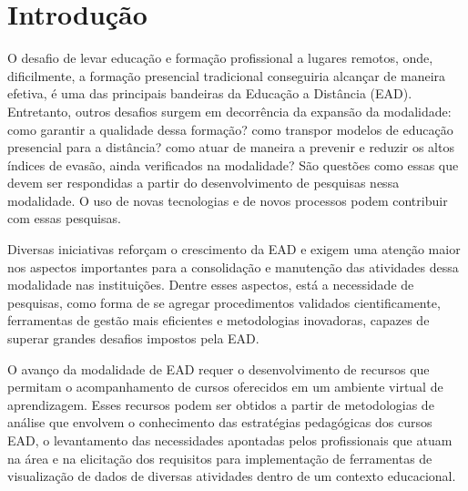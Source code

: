 \chapter{Introdução}

O desafio de levar educação e formação profissional a lugares remotos, onde,
dificilmente, a formação presencial tradicional conseguiria alcançar de maneira
efetiva, é uma das principais bandeiras da Educação a Distância (EAD).
Entretanto, outros desafios surgem em decorrência da expansão da modalidade:
como garantir a qualidade dessa formação? como transpor modelos de educação
presencial para a distância? como atuar de maneira a prevenir e reduzir os altos
índices de evasão, ainda verificados na modalidade? São questões como essas que
devem ser respondidas a partir do desenvolvimento de pesquisas nessa modalidade.
O uso de novas tecnologias e de novos processos podem contribuir com essas
pesquisas.



Diversas iniciativas reforçam o crescimento da EAD e exigem uma atenção maior
nos aspectos importantes para a consolidação e manutenção das atividades dessa
modalidade nas instituições. Dentre esses aspectos, está a necessidade de
pesquisas, como forma de se agregar procedimentos validados cientificamente,
ferramentas de gestão mais eficientes e metodologias inovadoras, capazes de
superar grandes desafios impostos pela EAD.

O avanço da modalidade de EAD requer o desenvolvimento de recursos que permitam
o acompanhamento de cursos oferecidos em um ambiente virtual de aprendizagem.
Esses recursos podem ser obtidos a partir de metodologias de análise que
envolvem o conhecimento das estratégias pedagógicas dos cursos EAD, o
levantamento das necessidades apontadas pelos profissionais que atuam na área e
na elicitação dos requisitos para implementação de ferramentas de visualização
de dados de diversas atividades dentro de um contexto educacional.
\cite{ramos2016abordagem}

